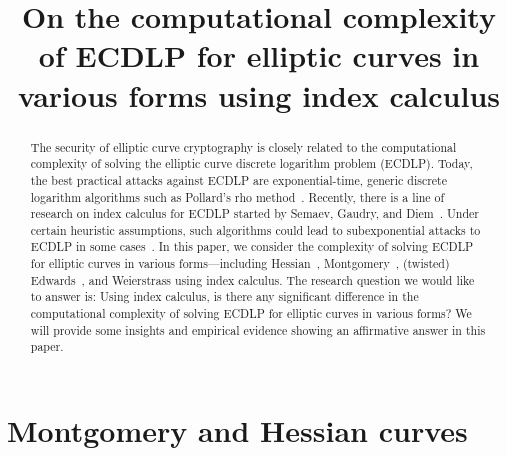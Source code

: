 \documentclass{llncs}
\begin{document}
%
\title{On the computational complexity of ECDLP for elliptic curves in
  various forms using index calculus}
%
%
%
%

\maketitle              %

\begin{abstract}
%
  The security of elliptic curve cryptography is closely related to
  the computational complexity of solving the elliptic curve discrete
  logarithm problem (ECDLP).
%
  Today, the best practical attacks against ECDLP are
  exponential-time, generic discrete logarithm algorithms such as
  Pollard's rho method~\cite{1978-pollard-kangaroo}.
%
  Recently, there is a line of research on index calculus for ECDLP
  started by Semaev, Gaudry, and
  Diem~\cite{DBLP:journals/iacr/Semaev04,DBLP:journals/jsc/Gaudry09,DBLP:journals/moc/Diem11}.
%
  Under certain heuristic assumptions, such algorithms could lead to
  subexponential attacks to ECDLP in some
  cases~\cite{DBLP:conf/eurocrypt/FaugerePPR12,DBLP:journals/iacr/PetitQ12,DBLP:conf/iwsec/HuangPST13}.
%
  In this paper, we consider the complexity of solving ECDLP for
  elliptic curves in various forms---including
  Hessian~\cite{DBLP:conf/ches/Smart01},
  Montgomery~\cite{1987-montgomery}, (twisted)
  Edwards~\cite{DBLP:journals/iacr/BernsteinL07,DBLP:journals/iacr/BernsteinBJLP08},
  and Weierstrass using index calculus.
%
  The research question we would like to answer is: Using index
  calculus, is there any significant difference in the computational
  complexity of solving ECDLP for elliptic curves in various forms?
%
  We will provide some insights and empirical evidence showing an
  affirmative answer in this paper.
%
\end{abstract}



\section{Montgomery and Hessian curves}
\label{sec:montgomery-hessian}





%
%


\end{document}
